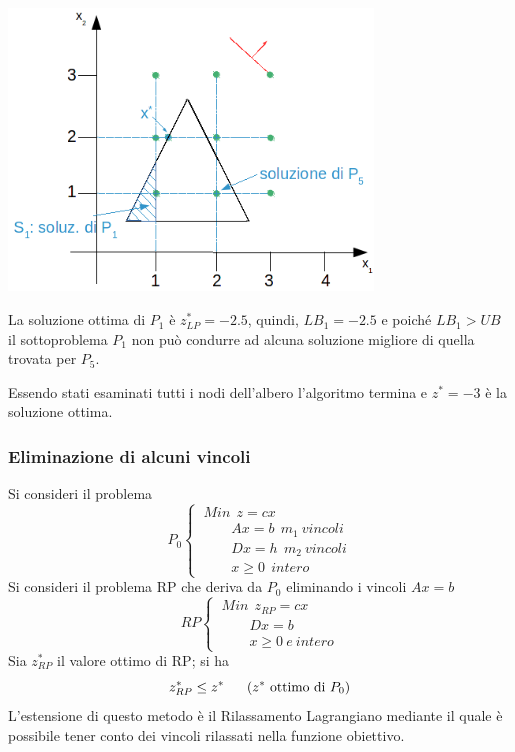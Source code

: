 \centerline{\includegraphics[height=7.5cm]{images/graph25.png}}

La soluzione ottima di $P_{1}$ è $z_{LP}^{*}=-2.5$, quindi, $LB_{1}=-2.5$ e poiché $LB_{1}>UB$ il sottoproblema $P_{1}$ non può condurre ad alcuna soluzione migliore di quella trovata per $P_{5}$.

Essendo stati esaminati tutti i nodi dell'albero l'algoritmo termina e $z^{*}=-3$ è la soluzione ottima.

\subsubsection{Eliminazione di alcuni vincoli}
Si consideri il problema
\begin{displaymath}
P_{0}
\begin{cases}
\ Min\ \ z=cx\\
\ \ \ \ \ \ \ \ \ \ A x = b\ \ m_{1}\ vincoli\\
\ \ \ \ \ \ \ \ \ \ Dx=h\ \ m_{2}\ vincoli\\
\ \ \ \ \ \ \ \ \ \ x\ge 0\ \ intero
\end{cases}
\end{displaymath}
Si consideri il problema RP che deriva da $P_{0}$ eliminando i vincoli $Ax=b$
\begin{displaymath}
RP
\begin{cases}
\ Min\ \ z_{RP}=cx\\
\ \ \ \ \ \ \ \ \ \ Dx=b\\
\ \ \ \ \ \ \ \ \ \ x \ge 0\ e\:intero
\end{cases}
\end{displaymath}
Sia $z_{RP}^{*}$ il valore ottimo di RP; si ha
\begin{equation*}
	z_{RP}^{*}\le z^{*} \ \ \ \ \ (z^{*}\textnormal{ ottimo di } P_{0})
\end{equation*}
L'estensione di questo metodo è il Rilassamento Lagrangiano mediante il quale è possibile tener conto dei vincoli rilassati nella funzione obiettivo.

